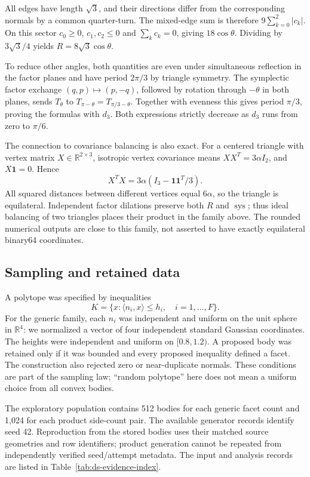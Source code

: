 All edges have length $\sqrt3$, and their directions differ from the
corresponding normals by a common quarter-turn. The mixed-edge sum is
therefore $9\sum_{k=0}^2|c_k|$. On this sector $c_0\geq0$,
$c_1,c_2\leq0$ and $\sum_k c_k=0$, giving $18\cos\theta$.
Dividing by $3\sqrt3/4$ yields $R=8\sqrt3\cos\theta$.

To reduce other angles, both quantities are even under simultaneous
reflection in the factor planes and have period $2\pi/3$ by triangle
symmetry. The symplectic factor exchange $(q,p)\mapsto(p,-q)$, followed
by rotation through $-\theta$ in both planes, sends $T_\theta$ to
$T_{\pi-\theta}=T_{\pi/3-\theta}$. Together with evenness this gives
period $\pi/3$, proving the formulas with $d_3$. Both expressions
strictly decrease as $d_3$ runs from zero to $\pi/6$.

The connection to covariance balancing is also exact. For a centered
triangle with vertex matrix $X\in\mathbb R^{2\times3}$, isotropic vertex
covariance means $XX^T=3\alpha I_2$, and $X\mathbf1=0$. Hence
\[
 X^TX=3\alpha(I_3-\mathbf1\mathbf1^T/3).
\]
All squared distances between different vertices equal $6\alpha$, so
the triangle is equilateral. Independent factor dilations preserve both
$R$ and $\operatorname{sys}$; thus ideal balancing of two triangles
places their product in the family above. The rounded numerical outputs
are close to this family, not asserted to have exactly equilateral
binary64 coordinates.

\subsection{Sampling and retained data}\label{app:ds-generation}

A polytope was specified by inequalities
\[
 K=\{x:\langle n_i,x\rangle\leq h_i,\quad i=1,\ldots,F\}.
\]
For the generic family, each $n_i$ was independent and uniform on the unit
sphere in $\mathbb R^4$: we normalized a vector of four independent standard
Gaussian coordinates. The heights were independent and uniform on
$[0.8,1.2)$. A proposed body was retained only if it was bounded and every
proposed inequality defined a facet. The construction also rejected zero or
near-duplicate normals. These conditions are part of the sampling law;
``random polytope'' here does not mean a uniform choice from all convex bodies.

The exploratory population contains 512 bodies for each generic facet count
and 1,024 for each product side-count pair. The available generator records
identify seed 42. Reproduction from the stored bodies uses their matched source
geometries and row identifiers; product generation cannot be repeated from
independently verified seed/attempt metadata. The input and analysis records
are listed in Table~\ref{tab:ds-evidence-index}.

